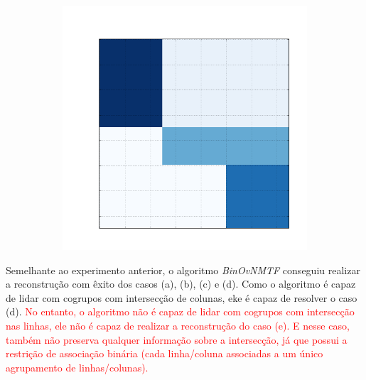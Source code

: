 \documentclass[
    12pt,                %
    oneside,            %
    a4paper,            %
    english,            %
    brazil                %
    ]{abntex2ppgsi}
\begin{document}
\begin{figure}[H]
\begin{subfigure}[b]{0.18\textwidth}
        \caption{}
    \end{subfigure}
    \begin{subfigure}[b]{0.18\textwidth}
        \includegraphics[width=\textwidth]{img/e-reconstruction-binovnmtf.png}
        \caption{}
    \end{subfigure}
    \label{fig:reconstruction:binovnmtf}
\end{figure}

Semelhante ao experimento anterior, o algoritmo \textit{BinOvNMTF} conseguiu realizar a reconstrução com êxito dos casos (a), (b), (c) e (d). Como o algoritmo é capaz de lidar com cogrupos com intersecção de colunas, eke é capaz de resolver o caso (d). \textcolor{red}{No entanto, o algoritmo não é capaz de lidar com cogrupos com intersecção nas linhas, ele não é capaz de realizar a reconstrução do caso (e). E nesse caso, também não preserva qualquer informação sobre a intersecção, já que possui a restrição de associação binária (cada linha/coluna associadas a um único agrupamento de linhas/colunas).}
\end{document}
